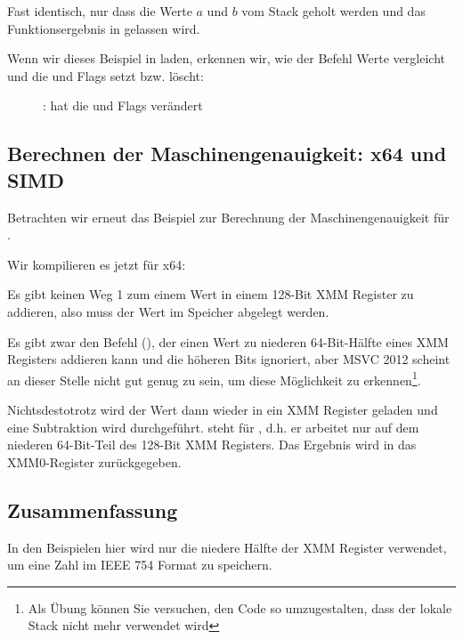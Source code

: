 
Fast identisch, nur dass die Werte $a$ und $b$ vom Stack geholt werden und das Funktionsergebnis in  gelassen
wird.

Wenn wir dieses Beispiel in \olly laden, erkennen wir, wie der Befehl  Werte vergleicht und die \CF und \PF
Flags setzt bzw. löscht:

\begin{figure}[H]
\centering
{}
\caption{\olly:  hat die \CF und \PF Flags verändert}
\label{fig:FPU_SIMD_d_max_olly}
\end{figure}

\subsection{Berechnen der Maschinengenauigkeit: x64 und SIMD}
\label{machine_epsilon_x64_and_SIMD}
Betrachten wir erneut das Beispiel zur Berechnung der Maschinengenauigkeit für \Tdouble
{}.

Wir kompilieren es jetzt für x64:


Es gibt keinen Weg 1 zum einem Wert in einem 128-Bit XMM Register zu addieren, also muss der Wert im Speicher abgelegt
werden.

Es gibt zwar den Befehl  (), der einen Wert zu niederen
64-Bit-Hälfte eines XMM Registers addieren kann und die höheren Bits ignoriert, aber MSVC 2012 scheint an dieser Stelle
nicht gut genug zu sein, um diese Möglichkeit zu erkennen\footnote{Als Übung können Sie versuchen, den Code so
umzugestalten, dass der lokale Stack nicht mehr verwendet wird}.

Nichtsdestotrotz wird der Wert dann wieder in ein XMM Register geladen und eine Subtraktion wird durchgeführt.
 steht für , d.h. er arbeitet nur auf dem niederen
64-Bit-Teil des 128-Bit XMM Registers.
Das Ergebnis wird in das XMM0-Register zurückgegeben.



\subsection{Zusammenfassung}
In den Beispielen hier wird nur die niedere Hälfte der XMM Register verwendet, um eine Zahl im IEEE 754 Format zu
speichern.

